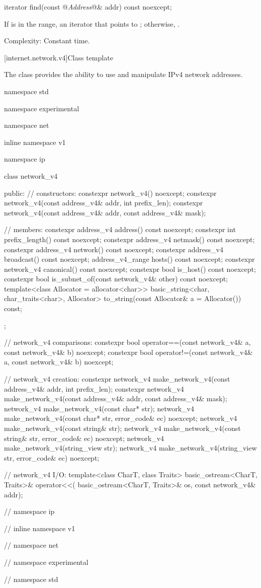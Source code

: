 \begin{itemdecl}
iterator find(const @\textit{Address}@& addr) const noexcept;
\end{itemdecl}

\begin{itemdescr}
\pnum
\returns If  is in the range, an iterator that points to ; otherwise, .

\pnum
Complexity: Constant time.
\end{itemdescr}



[internet.network.v4]{Class template }

\pnum
The class  provides the ability to use and manipulate IPv4 network addresses.

\begin{codeblock}
namespace std {
namespace experimental {
namespace net {
inline namespace v1 {
namespace ip {

  class network_v4
  {
  public:
    // constructors:
    constexpr network_v4() noexcept;
    constexpr network_v4(const address_v4& addr, int prefix_len);
    constexpr network_v4(const address_v4& addr, const address_v4& mask);

    // members:
    constexpr address_v4 address() const noexcept;
    constexpr int prefix_length() const noexcept;
    constexpr address_v4 netmask() const noexcept;
    constexpr address_v4 network() const noexcept;
    constexpr address_v4 broadcast() const noexcept;
    address_v4_range hosts() const noexcept;
    constexpr network_v4 canonical() const noexcept;
    constexpr bool is_host() const noexcept;
    constexpr bool is_subnet_of(const network_v4& other) const noexcept;
    template<class Allocator = allocator<char>>
      basic_string<char, char_traits<char>, Allocator>
        to_string(const Allocator& a = Allocator()) const;
  };

  // network_v4 comparisons:
  constexpr bool operator==(const network_v4& a, const network_v4& b) noexcept;
  constexpr bool operator!=(const network_v4& a, const network_v4& b) noexcept;

  // network_v4 creation:
  constexpr network_v4 make_network_v4(const address_v4& addr, int prefix_len);
  constexpr network_v4 make_network_v4(const address_v4& addr, const address_v4& mask);
  network_v4 make_network_v4(const char* str);
  network_v4 make_network_v4(const char* str, error_code& ec) noexcept;
  network_v4 make_network_v4(const string& str);
  network_v4 make_network_v4(const string& str, error_code& ec) noexcept;
  network_v4 make_network_v4(string_view str);
  network_v4 make_network_v4(string_view str, error_code& ec) noexcept;

  // network_v4 I/O:
  template<class CharT, class Traits>
    basic_ostream<CharT, Traits>& operator<<(
      basic_ostream<CharT, Traits>& os, const network_v4& addr);

} // namespace ip
} // inline namespace v1
} // namespace net
} // namespace experimental
} // namespace std
\end{codeblock}

